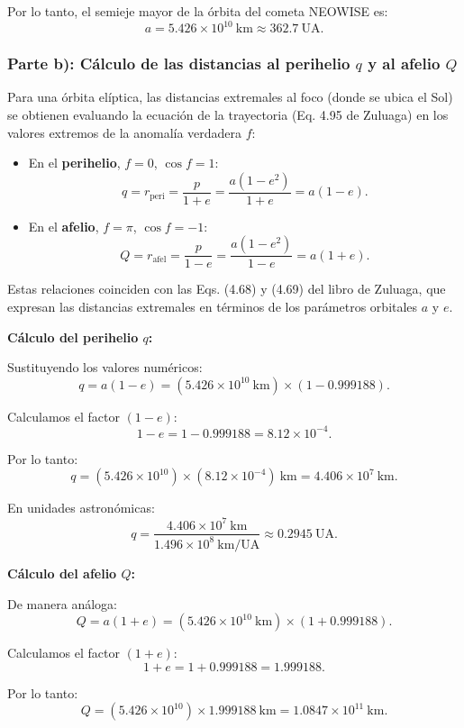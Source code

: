 \documentclass[12pt, a4paper]{article}
\begin{document}
Por lo tanto, el semieje mayor de la órbita del cometa NEOWISE es:
$$\boxed{a = 5.426 \times 10^{10}~\text{km} \approx 362.7~\text{UA}}.$$

\subsubsection*{Parte b): Cálculo de las distancias al perihelio $q$ y al afelio $Q$}

Para una órbita elíptica, las distancias extremales al foco (donde se ubica el Sol) se obtienen evaluando la ecuación de la trayectoria (Eq. 4.95 de Zuluaga) en los valores extremos de la anomalía verdadera $f$:

\begin{itemize}
    \item En el \textbf{perihelio}, $f = 0$, $\cos f = 1$:
    $$q = r_{\text{peri}} = \frac{p}{1+e} = \frac{a(1-e^2)}{1+e} = a(1-e).$$
    
    \item En el \textbf{afelio}, $f = \pi$, $\cos f = -1$:
    $$Q = r_{\text{afel}} = \frac{p}{1-e} = \frac{a(1-e^2)}{1-e} = a(1+e).$$
\end{itemize}

Estas relaciones coinciden con las Eqs. (4.68) y (4.69) del libro de Zuluaga, que expresan las distancias extremales en términos de los parámetros orbitales $a$ y $e$.

\textbf{Cálculo del perihelio $q$:}

Sustituyendo los valores numéricos:
$$q = a(1-e) = (5.426 \times 10^{10}~\text{km}) \times (1 - 0.999188).$$

Calculamos el factor $(1-e)$:
$$1 - e = 1 - 0.999188 = 8.12 \times 10^{-4}.$$

Por lo tanto:
$$q = (5.426 \times 10^{10}) \times (8.12 \times 10^{-4})~\text{km} = 4.406 \times 10^7~\text{km}.$$

En unidades astronómicas:
$$q = \frac{4.406 \times 10^7~\text{km}}{1.496 \times 10^8~\text{km/UA}} \approx 0.2945~\text{UA}.$$

\textbf{Cálculo del afelio $Q$:}

De manera análoga:
$$Q = a(1+e) = (5.426 \times 10^{10}~\text{km}) \times (1 + 0.999188).$$

Calculamos el factor $(1+e)$:
$$1 + e = 1 + 0.999188 = 1.999188.$$

Por lo tanto:
$$Q = (5.426 \times 10^{10}) \times 1.999188~\text{km} = 1.0847 \times 10^{11}~\text{km}.$$
\end{document}

